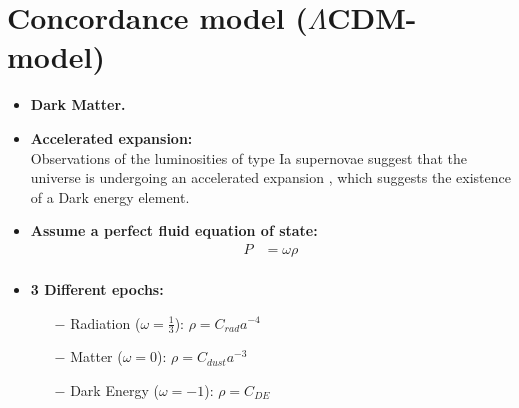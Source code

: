\documentclass{beamer}
\begin{document}
\section{Concordance model ($\Lambda$CDM-model)}
\begin{frame}
\begin{itemize}
\frametitle{\insertsectionhead}

\item \textbf{Dark Matter.}
\item \textbf{Accelerated expansion:}\\
Observations of the luminosities of type Ia supernovae suggest that the universe is undergoing an accelerated expansion \citep{NPSNe, RMCGAU}, which suggests the existence of a Dark energy element.
\item \textbf{Assume a perfect fluid equation of state:}
\begin{equation}\label{eq:PFEoS}
\begin{split}
P &= \omega\rho         \\
\end{split}
\end{equation}
\item \textbf{3 Different epochs:}
\begin{itemize}
\item[$-$] Radiation ($\omega=\frac{1}{3}$): $\rho=C_{rad}a^{-4}$ \\
\item[$-$] Matter ($\omega=0$): $\rho=C_{dust}a^{-3}$ \\
\item[$-$] Dark Energy ($\omega=-1$): $\rho=C_{DE}$\\
\end{itemize}

\end{itemize}
\end{frame}
\end{document}
